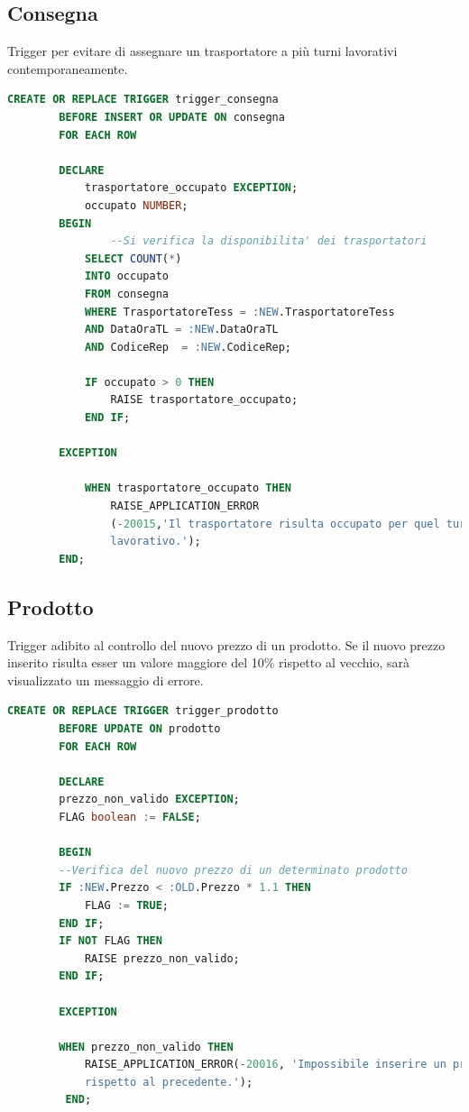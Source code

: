 \documentclass[12pt]{report}
\begin{document}
\subsection*{Consegna}
Trigger per evitare di assegnare un trasportatore a più turni lavorativi contemporaneamente.
\begin{lstlisting}[language=SQL,caption={TR\_CONSEGNA}]
	CREATE OR REPLACE TRIGGER trigger_consegna
		BEFORE INSERT OR UPDATE ON consegna
		FOR EACH ROW

		DECLARE
			trasportatore_occupato EXCEPTION;
			occupato NUMBER;
		BEGIN
                --Si verifica la disponibilita' dei trasportatori
			SELECT COUNT(*)
			INTO occupato
			FROM consegna
			WHERE TrasportatoreTess = :NEW.TrasportatoreTess
			AND DataOraTL = :NEW.DataOraTL
			AND CodiceRep  = :NEW.CodiceRep;

			IF occupato > 0 THEN
				RAISE trasportatore_occupato;
			END IF;

		EXCEPTION

			WHEN trasportatore_occupato THEN
				RAISE_APPLICATION_ERROR
				(-20015,'Il trasportatore risulta occupato per quel turno 
				lavorativo.');
		END;
\end{lstlisting}

\subsection*{Prodotto}
Trigger adibito al controllo del nuovo prezzo di un prodotto. Se il nuovo prezzo inserito risulta esser un valore maggiore del 10\% rispetto al vecchio, sarà visualizzato un messaggio di errore.
\begin{lstlisting}[language=SQL,caption={TR\_PRODOTTO}]
    CREATE OR REPLACE TRIGGER trigger_prodotto
        BEFORE UPDATE ON prodotto
        FOR EACH ROW

        DECLARE
        prezzo_non_valido EXCEPTION;
        FLAG boolean := FALSE;
        
        BEGIN
        --Verifica del nuovo prezzo di un determinato prodotto
        IF :NEW.Prezzo < :OLD.Prezzo * 1.1 THEN
            FLAG := TRUE;
        END IF;
        IF NOT FLAG THEN
            RAISE prezzo_non_valido;
        END IF;

        EXCEPTION
        
        WHEN prezzo_non_valido THEN
            RAISE_APPLICATION_ERROR(-20016, 'Impossibile inserire un prezzo maggiore del 10%
            rispetto al precedente.');
         END;
\end{lstlisting}
\end{document}
